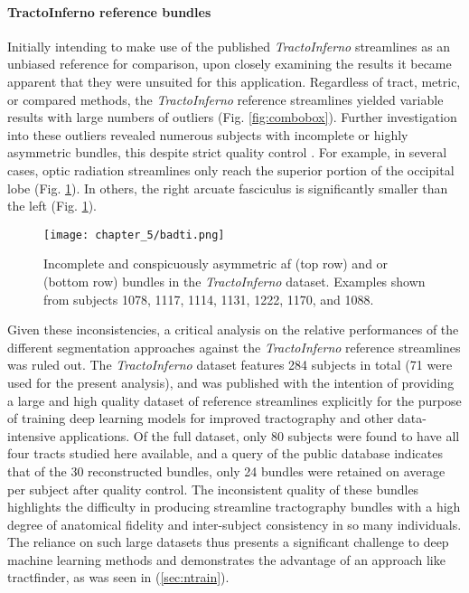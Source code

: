 \paragraph*{TractoInferno reference bundles}


Initially intending to make use of the published \textit{TractoInferno} streamlines as an unbiased reference for comparison, upon closely examining the results it became apparent that they were unsuited for this application.
Regardless of tract, metric, or compared methods, the \textit{TractoInferno} reference streamlines yielded variable results with large numbers of outliers (Fig. \ref{fig:combobox}).
Further investigation into these outliers revealed numerous subjects with incomplete or highly asymmetric bundles, this despite strict quality control \autocite{Poulin2022a}.
For example, in several cases, optic radiation streamlines only reach the superior portion of the occipital lobe (Fig. \ref{fig:duds}).
In others, the right arcuate fasciculus is significantly smaller than the left (Fig. \ref{fig:duds}).

\begin{figure}
  \centering
  \texttt{[image: chapter\_5/badti.png]}
  \caption{Incomplete and conspicuously asymmetric \gls{af} (top row) and \gls{or} (bottom row) bundles in the \textit{TractoInferno} dataset. Examples shown from subjects 1078, 1117, 1114, 1131, 1222, 1170, and 1088.}
  \label{fig:duds}
\end{figure}

Given these inconsistencies, a critical analysis on the relative performances of the different segmentation approaches against the \textit{TractoInferno} reference streamlines was ruled out.
The \textit{TractoInferno} dataset features 284 subjects in total (71 were used for the present analysis), and was published with the intention of providing a large and high quality dataset of reference streamlines explicitly for the purpose of training deep learning models for improved tractography and other data-intensive applications.
Of the full dataset, only 80 subjects were found to have all four tracts studied here available, and a query of the public database\autocite{Poulin2022a} indicates that of the 30 reconstructed bundles, only 24 bundles were retained on average per subject after quality control.
The inconsistent quality of these bundles highlights the difficulty in producing streamline tractography bundles with a high degree of anatomical fidelity and inter-subject consistency in so many individuals.
The reliance on such large datasets thus presents a significant challenge to deep machine learning methods and demonstrates the advantage of an approach like tractfinder, as was seen in (\ref{sec:ntrain}).

